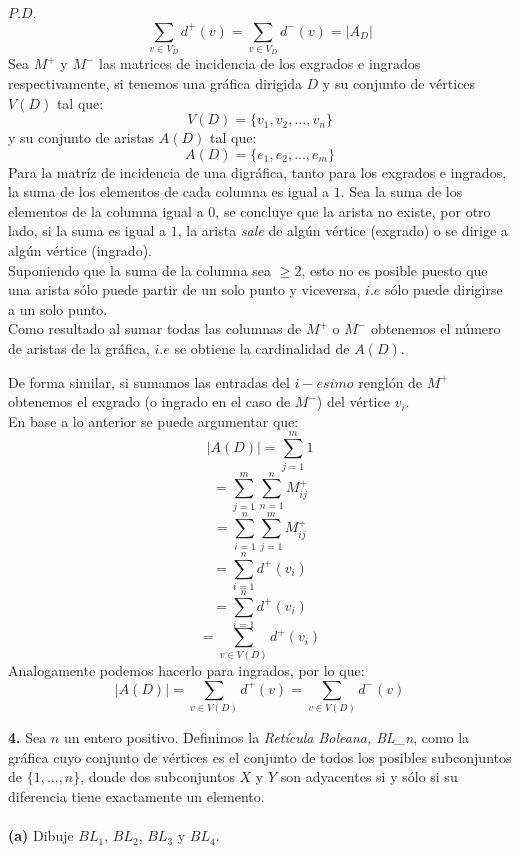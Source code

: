 \documentclass[12pt]{article}
\begin{document}
$P.D.$
\[\sum_{\displaystyle v \in V_D} d^{+}(v) = \sum_{\displaystyle v \in V_D} d^{-}(v) = |A_D|\]
Sea $M^+$ y $M^-$ las matrices de incidencia de los exgrados e ingrados respectivamente, si tenemos una gráfica dirigida $D$ y su conjunto
de vértices $V(D)$ tal que:
\[V(D) = \{v_1, v_2, ..., v_n\}\]
y su conjunto de aristas $A(D)$ tal que:
\[A(D) = \{e_1, e_2, ..., e_m\}\]
Para la matríz de incidencia de una digráfica, tanto para los exgrados e ingrados, la suma
de los elementos de cada columna es igual a $1$. Sea la suma de los elementos de la columna igual a $0$,
se concluye que la arista no existe, por otro lado, si la suma es igual a $1$, la arista \textit{sale} de algún vértice (exgrado)
o se dirige a algún vértice (ingrado).\\

Suponiendo que la suma de la columna sea $\geq 2$, esto no es posible puesto que una arista sólo puede partir de un solo punto y viceversa, $i.e$ sólo 
puede dirigirse a un solo punto.\\

Como resultado al sumar todas las columnas de $M^+$ o $M^-$ obtenemos el número de aristas de la gráfica, $i.e$ se obtiene la 
cardinalidad de $A(D)$.

De forma similar, si sumamos las entradas del $i-esimo$ renglón de $M^+$ obtenemos el exgrado (o ingrado en el caso de $M^-$) del vértice $v_i$.\\

En base a lo anterior se puede argumentar que:
\[\mid A(D) \mid = \sum\limits_{j = 1}^{m} 1\]
\[= \sum\limits_{j = 1}^{m} \sum\limits_{n = 1}^{n} M^+_{ij}\]
\[= \sum\limits_{i = 1}^{n} \sum\limits_{j = 1}^{m} M^+_{ij}\]
\[= \sum\limits_{i = 1}^{n} d^+(v_i)\]
\[= \sum\limits_{i = 1}^{n} d^+(v_i)\]
\[= \sum_{\displaystyle v \in V(D)} d^+(v_i)\] 
Analogamente podemos hacerlo para ingrados, por lo que:
\[\mid A(D) \mid = \sum_{\displaystyle v \in V(D)} d^+(v) = \sum_{\displaystyle v \in V(D)} d^-(v)\]



\vspace{1cm}
%
%
\textbf{4.} Sea $n$ un entero positivo. Definimos la \textit{Retícula Boleana, BL\_n}, como
la gráfica cuyo conjunto de vértices es el conjunto de todos los posibles subconjuntos
de $\{1, ..., n\}$, donde dos subconjuntos $X$ y $Y$ son adyacentes si y sólo si su diferencia
tiene exactamente un elemento.\\
\\
\textbf{(a)} Dibuje $BL_1$, $BL_2$, $BL_3$ y $BL_4$.
\\
\end{document}
